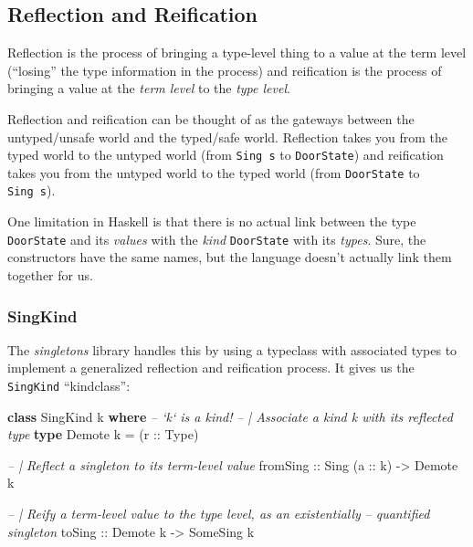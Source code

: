 \documentclass[]{article}
\newenvironment{Shaded}{}{}
\newcommand{\CommentTok}[1]{\textcolor[rgb]{0.38,0.63,0.69}{\textit{#1}}}
\newcommand{\DataTypeTok}[1]{\textcolor[rgb]{0.56,0.13,0.00}{#1}}
\newcommand{\KeywordTok}[1]{\textcolor[rgb]{0.00,0.44,0.13}{\textbf{#1}}}
\newcommand{\NormalTok}[1]{#1}
\newcommand{\OtherTok}[1]{\textcolor[rgb]{0.00,0.44,0.13}{#1}}
\begin{document}
\hypertarget{reflection-and-reification}{%
\subsection{Reflection and Reification}\label{reflection-and-reification}}

Reflection is the process of bringing a type-level thing to a value at the term
level (``losing'' the type information in the process) and reification is the
process of bringing a value at the \emph{term level} to the \emph{type level}.

Reflection and reification can be thought of as the gateways between the
untyped/unsafe world and the typed/safe world. Reflection takes you from the
typed world to the untyped world (from \texttt{Sing\ s} to \texttt{DoorState})
and reification takes you from the untyped world to the typed world (from
\texttt{DoorState} to \texttt{Sing\ s}).

One limitation in Haskell is that there is no actual link between the type
\texttt{DoorState} and its \emph{values} with the \emph{kind} \texttt{DoorState}
with its \emph{types}. Sure, the constructors have the same names, but the
language doesn't actually link them together for us.

\hypertarget{singkind}{%
\subsubsection{SingKind}\label{singkind}}

The \emph{singletons} library handles this by using a typeclass with associated
types to implement a generalized reflection and reification process. It gives us
the \texttt{SingKind} ``kindclass'':

\begin{Shaded}
\begin{Highlighting}[]
\KeywordTok{class} \DataTypeTok{SingKind}\NormalTok{ k }\KeywordTok{where}      \CommentTok{-- `k` is a kind!}
    \CommentTok{-- | Associate a kind k with its reflected type}
    \KeywordTok{type} \DataTypeTok{Demote}\NormalTok{ k }\OtherTok{=}\NormalTok{ (}\OtherTok{r ::} \DataTypeTok{Type}\NormalTok{)}

    \CommentTok{-- | Reflect a singleton to its term-level value}
\OtherTok{    fromSing ::} \DataTypeTok{Sing}\NormalTok{ (}\OtherTok{a ::}\NormalTok{ k) }\OtherTok{->} \DataTypeTok{Demote}\NormalTok{ k}

    \CommentTok{-- | Reify a term-level value to the type level, as an existentially}
    \CommentTok{-- quantified singleton}
\OtherTok{    toSing ::} \DataTypeTok{Demote}\NormalTok{ k }\OtherTok{->} \DataTypeTok{SomeSing}\NormalTok{ k}
\end{Highlighting}
\end{Shaded}
\end{document}
